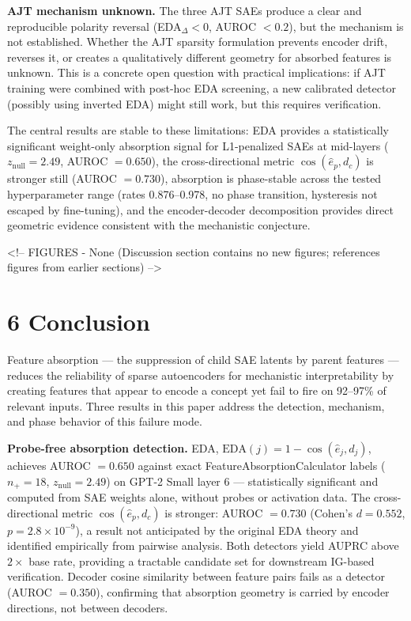 \documentclass{article}
\begin{document}
\textbf{AJT mechanism unknown.} The three AJT SAEs produce a clear and reproducible polarity
reversal (EDA$_\Delta < 0$, AUROC $< 0.2$), but the mechanism is not established. Whether
the AJT sparsity formulation prevents encoder drift, reverses it, or creates a qualitatively
different geometry for absorbed features is unknown. This is a concrete open question with
practical implications: if AJT training were combined with post-hoc EDA screening, a new
calibrated detector (possibly using inverted EDA) might still work, but this requires
verification.


The central results are stable to these limitations: EDA provides a statistically significant
weight-only absorption signal for L1-penalized SAEs at mid-layers ($z_\text{null} = 2.49$,
AUROC $= 0.650$), the cross-directional metric $\cos(\hat{e}_p, d_c)$ is stronger still
(AUROC $= 0.730$), absorption is phase-stable across the tested hyperparameter range
(rates 0.876–0.978, no phase transition, hysteresis not escaped by fine-tuning), and the
encoder-decoder decomposition provides direct geometric evidence consistent with the
mechanistic conjecture.

<!-- FIGURES
- None (Discussion section contains no new figures; references figures from earlier sections)
-->


\section{6 Conclusion}

Feature absorption — the suppression of child SAE latents by parent features — reduces the
reliability of sparse autoencoders for mechanistic interpretability by creating features that
appear to encode a concept yet fail to fire on 92–97\% of relevant inputs. Three results in
this paper address the detection, mechanism, and phase behavior of this failure mode.

\textbf{Probe-free absorption detection.} EDA, $\text{EDA}(j) = 1 - \cos(\hat{e}_j, d_j)$, achieves
AUROC $= 0.650$ against exact FeatureAbsorptionCalculator labels ($n_+ = 18$, $z_\text{null}
= 2.49$) on GPT-2 Small layer 6 — statistically significant and computed from SAE weights
alone, without probes or activation data. The cross-directional metric $\cos(\hat{e}_p, d_c)$
is stronger: AUROC $= 0.730$ (Cohen's $d = 0.552$, $p = 2.8 \times 10^{-9}$), a result not
anticipated by the original EDA theory and identified empirically from pairwise analysis. Both
detectors yield AUPRC above $2 \times$ base rate, providing a tractable candidate set for
downstream IG-based verification. Decoder cosine similarity between feature pairs fails as a
detector (AUROC $= 0.350$), confirming that absorption geometry is carried by encoder directions,
not between decoders.
\end{document}

